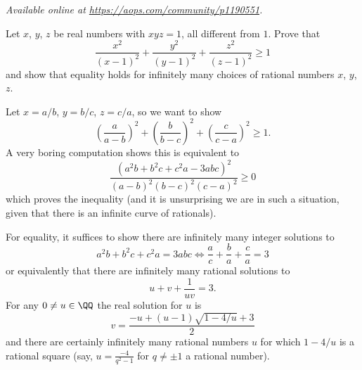 \textsl{Available online at \url{https://aops.com/community/p1190551}.}
\begin{mdframed}[style=mdpurplebox,frametitle={Problem statement}]
Let $x$, $y$, $z$ be real numbers with $xyz = 1$,
all different from $1$.
Prove that
\[ \frac{x^2}{(x-1)^2} + \frac{y^2}{(y-1)^2}
+ \frac{z^2}{(z-1)^2} \ge 1 \]
and show that equality holds for infinitely many choices
of rational numbers $x$, $y$, $z$.
\end{mdframed}
Let $x=a/b$, $y=b/c$, $z=c/a$, so we want to show
\[ \left(\frac{a}{a-b}\right)^2+\left(\frac{b}{b-c}\right)^2
  +\left(\frac{c}{c-a}\right)^2\ge 1.\]
A very boring computation shows this is equivalent to
\[ \frac{(a^2b+b^2c+c^2a-3abc)^2}%
  {(a-b)^2(b-c)^2(c-a)^2}\ge 0\]
which proves the inequality
(and it is unsurprising we are in such a situation,
given that there is an infinite curve of rationals).

For equality, it suffices to show there are infinitely
many integer solutions to
\[ a^2b+b^2c+c^2a=3abc
  \iff \frac ac + \frac ba + \frac ca = 3
\]
or equivalently that
there are infinitely many rational solutions to
\[ u + v + \frac{1}{uv} = 3. \]
For any $0 \neq u \in \QQ$ the real solution for $u$ is
\[ v = \frac{-u + (u-1)\sqrt{1-4/u} + 3}{2} \]
and there are certainly infinitely many rational numbers $u$
for which $1-4/u$ is a rational square
(say, $u = \frac{-4}{q^2-1}$ for $q \neq \pm 1$ a rational number).
\pagebreak